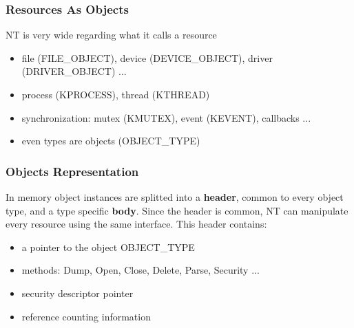 
\begin{frame}
  \frametitle{Resources As Objects}

  NT is very wide regarding what it calls a resource

  \begin{itemize}
    \item
      file (FILE\_OBJECT), device (DEVICE\_OBJECT), driver (DRIVER\_OBJECT) ...
    \item
      process (KPROCESS), thread (KTHREAD)
    \item
      synchronization: mutex (KMUTEX), event (KEVENT), callbacks ...
    \item
      even types are objects (OBJECT\_TYPE)
  \end{itemize}

\end{frame}


\begin{frame}
  \frametitle{Objects Representation}

  In memory object instances are splitted into a \textbf{header}, common to every
  object type, and a type specific \textbf{body}. Since the header is common,
  NT can manipulate every resource using the same interface. This header contains:

  \begin{itemize}
    \item
      a pointer to the object OBJECT\_TYPE
    \item
      methods: Dump, Open, Close, Delete, Parse, Security ...
    \item
      security descriptor pointer
    \item
      reference counting information 
  \end{itemize}
\end{frame}


